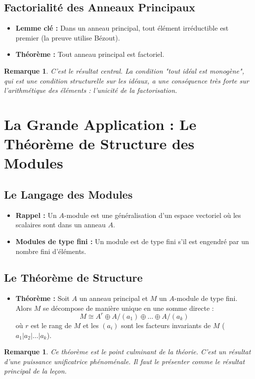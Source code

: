 \documentclass[12pt, a4paper, parskip=full]{report}
\theoremstyle{agregstyle}
\newtheorem{remark}[definition]{Remarque}
\begin{document}
\subsection{Factorialité des Anneaux Principaux}
\begin{itemize}
    \item \textbf{Lemme clé :} Dans un anneau principal, tout élément irréductible est premier (la preuve utilise Bézout).
    \item \textbf{Théorème :} Tout anneau principal est factoriel.
\end{itemize}
\begin{remark}
    C'est le résultat central. La condition "tout idéal est monogène", qui est une condition structurelle sur les idéaux, a une conséquence très forte sur l'arithmétique des éléments : l'unicité de la factorisation.
\end{remark}

\section{La Grande Application : Le Théorème de Structure des Modules}
\subsection{Le Langage des Modules}
\begin{itemize}
    \item \textbf{Rappel :} Un $A$-module est une généralisation d'un espace vectoriel où les scalaires sont dans un anneau $A$.
    \item \textbf{Modules de type fini :} Un module est de type fini s'il est engendré par un nombre fini d'éléments.
\end{itemize}
\subsection{Le Théorème de Structure}
\begin{itemize}
    \item \textbf{Théorème :} Soit $A$ un anneau principal et $M$ un $A$-module de type fini. Alors $M$ se décompose de manière unique en une somme directe :
    $$ M \cong A^r \oplus A/(a_1) \oplus \dots \oplus A/(a_k) $$
    où $r$ est le rang de $M$ et les $(a_i)$ sont les facteurs invariants de $M$ ($a_1 | a_2 | \dots | a_k$).
\end{itemize}
\begin{remark}
    Ce théorème est le point culminant de la théorie. C'est un résultat d'une puissance unificatrice phénoménale. Il faut le présenter comme le résultat principal de la leçon.
\end{remark}
\end{document}
